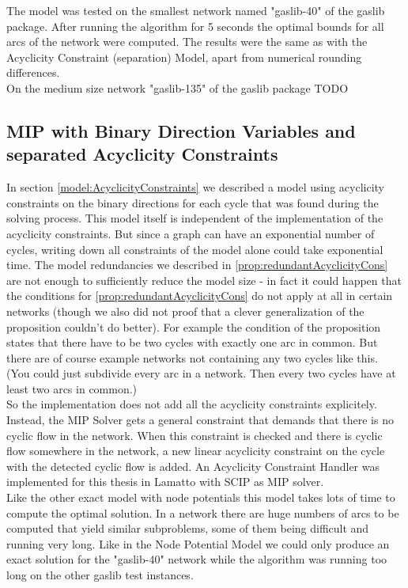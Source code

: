 The model was tested on the smallest network named "gaslib-40" of the gaslib package. After running the algorithm for 5 
seconds the optimal bounds for all arcs of the network were computed. The results were the same as with the Acyclicity 
Constraint (separation) Model, apart from numerical rounding differences. \\

On the medium size network "gaslib-135" of the gaslib package TODO


\subsection{MIP with Binary Direction Variables and separated Acyclicity Constraints}
In section \ref{model:AcyclicityConstraints} we described a model using acyclicity constraints on the binary directions 
for each cycle that was found during the solving process.
This model itself is independent of the implementation of the acyclicity constraints. But since a graph can have an 
exponential number of cycles, writing down all constraints of the model alone could take exponential time. The 
model redundancies we described in \ref{prop:redundantAcyclicityCons} are not enough to sufficiently reduce the model 
size - in fact it could happen that the conditions for \ref{prop:redundantAcyclicityCons} do not apply at all in 
certain networks (though we also did not proof that a clever generalization of the proposition couldn't do better). 
For example the condition of the proposition states that there have to be two cycles with exactly one arc in common. 
But there are of course example networks not containing any two cycles like this. (You could just subdivide every arc 
in a network. Then every two cycles have at least two arcs in common.)\\

So the implementation does not add all the acyclicity constraints explicitely. Instead, the MIP Solver gets a 
general constraint that demands that there is no cyclic flow in the network. When this constraint is checked and there 
is cyclic flow somewhere in the network, a new linear acyclicity constraint on the cycle with the detected cyclic flow 
is added. An Acyclicity Constraint Handler was implemented for this thesis in Lamatto with SCIP as MIP solver. \\

Like the other exact model with node potentials this model takes lots of time to compute the optimal solution. In 
a network there are huge numbers of arcs to be computed that yield similar subproblems, some of them being 
difficult and running very long. Like in the Node Potential Model we could only produce an exact solution for the 
"gaslib-40" network while the algorithm was running too long on the other gaslib test instances.

